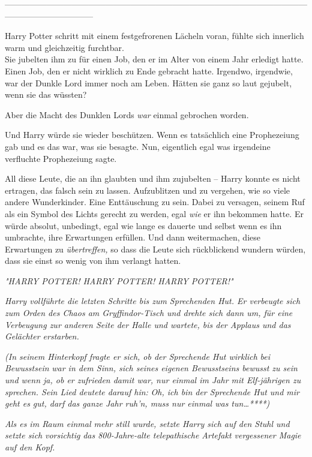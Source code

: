 {--------------------------------------------------------------------------------------------------------------------------------------------

Harry Potter schritt mit einem festgefrorenen Lächeln voran, fühlte sich innerlich warm und gleichzeitig furchtbar.\\ Sie jubelten ihm zu für einen Job, den er im Alter von einem Jahr erledigt hatte. Einen Job, den er nicht wirklich zu Ende gebracht hatte. Irgendwo, irgendwie, war der Dunkle Lord immer noch am Leben. Hätten sie ganz so laut gejubelt, wenn sie das wüssten?

Aber die Macht des Dunklen Lords \emph{war} einmal gebrochen worden.

Und Harry würde sie wieder beschützen. Wenn es tatsächlich eine Prophezeiung gab und es das war, was sie besagte. Nun, eigentlich egal was irgendeine verfluchte Prophezeiung sagte.

All diese Leute, die an ihn glaubten und ihm zujubelten -- Harry konnte es nicht ertragen, das falsch sein zu lassen. Aufzublitzen und zu vergehen, wie so viele andere Wunderkinder. Eine Enttäuschung zu sein. Dabei zu versagen, seinem Ruf als ein Symbol des Lichts gerecht zu werden, egal \emph{wie} er ihn bekommen hatte. Er würde absolut, unbedingt, egal wie lange es dauerte und selbst wenn es ihn umbrachte, ihre Erwartungen erfüllen. Und dann weitermachen, diese Erwartungen zu \emph{übertreffen,} so dass die Leute sich rückblickend wundern würden, dass sie einst so wenig von ihm verlangt hatten.

\emph{"HARRY POTTER! HARRY POTTER! HARRY POTTER!"}

\emph{Harry vollführte die letzten Schritte bis zum Sprechenden Hut. Er verbeugte sich zum Orden des Chaos am Gryffindor-Tisch und drehte sich dann um, für eine Verbeugung zur anderen Seite der Halle und wartete, bis der Applaus und das Gelächter erstarben.}

\emph{(In seinem Hinterkopf fragte er sich, ob der Sprechende Hut wirklich} \emph{\emph{bei Bewusstsein}} \emph{war in dem Sinn, sich seines eigenen Bewusstseins bewusst zu sein und wenn ja, ob er zufrieden damit war, nur einmal im Jahr mit Elf-jährigen zu sprechen. Sein Lied deutete darauf hin:} \emph{\emph{Oh, ich bin der Sprechende Hut und mir geht es gut, darf das ganze Jahr ruh'n, muss nur einmal was tun…}****)}

\emph{Als es im Raum einmal mehr still wurde, setzte Harry sich auf den Stuhl und setzte sich} \emph{\emph{vorsichtig}} \emph{das 800-Jahre-alte telepathische Artefakt vergessener Magie auf den Kopf.}

}
